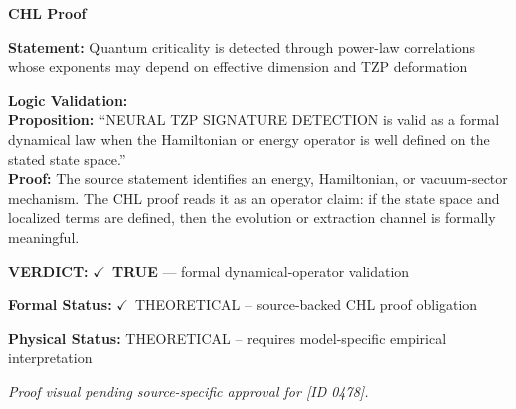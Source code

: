 \vspace{0.45em}
\noindent\textbf{CHL Proof}\par
\textbf{Statement:} Quantum criticality is detected through power-law correlations whose exponents may
depend on effective dimension and TZP deformation

\textbf{Logic Validation:}\\
\textbf{Proposition:} ``NEURAL TZP SIGNATURE DETECTION is valid as a formal dynamical law when the Hamiltonian
or energy operator is well defined on the stated state space.''\\
\textbf{Proof:} The source statement identifies an energy, Hamiltonian, or vacuum-sector mechanism. The
CHL proof reads it as an operator claim: if the state space and localized terms are
defined, then the evolution or extraction channel is formally meaningful.

\textbf{VERDICT:} \ensuremath{\checkmark}\ \textbf{TRUE} --- formal dynamical-operator validation

\textbf{Formal Status:} \ensuremath{\checkmark}\ THEORETICAL -- source-backed CHL proof obligation

\textbf{Physical Status:} THEORETICAL -- requires model-specific empirical interpretation
\par\vspace{0.45em}
\par
\vfill
\begingroup\footnotesize\itshape
Proof visual pending source-specific approval for [ID 0478].
\par\endgroup
\vfill
\endgroup
\endgroup
